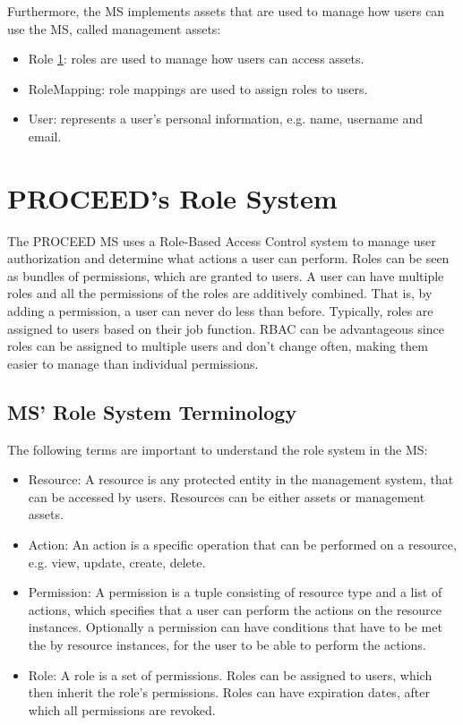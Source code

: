 Furthermore, the MS implements assets that are used to manage how users can use the MS,
called management assets:

\begin{itemize}
	\item Role \ref{cha:relatedwork:proceedroles}: roles are used to manage how users can access assets.
	\item{RoleMapping}: role mappings are used to assign roles to users.
	\item User: represents a user's personal information, e.g. name, username and email.
\end{itemize}


\section{PROCEED's Role System}
\label{cha:relatedwork:proceedroles}

The PROCEED MS uses a Role-Based Access Control %
system to manage user authorization and determine what actions a user can perform.
Roles can be seen as bundles of permissions, which are granted to users.
A user can have multiple roles and all the permissions of the roles are additively
combined. That is, by adding a permission, a user can never do less than before.
Typically, roles are assigned to users based on their job function.
RBAC can be advantageous since roles can be assigned to multiple users and
don't change often, making them easier to manage than individual permissions.

\subsection{MS' Role System Terminology}
\label{cha:relatedwork:proceedroles:terminology}

The following terms are important to understand the role system in the MS:

\begin{itemize}
	\item Resource: A resource is any protected entity in the management system, that can be
	      accessed by users. Resources can be either assets or management assets.
	\item Action: An action is a specific operation that can be performed on a resource, e.g. view, update, create, delete.
	\item Permission: A permission is a tuple consisting of resource type and a list of
        actions, which specifies that a user can perform the actions on the resource instances.
        Optionally a permission can have conditions that have to be met the by resource instances,
        for the user to be able to perform the actions.
	\item Role: A role is a set of permissions. Roles can be assigned to users, which then
	      inherit the role's permissions. Roles can have expiration dates, after which all
	      permissions are revoked.
\end{itemize}

